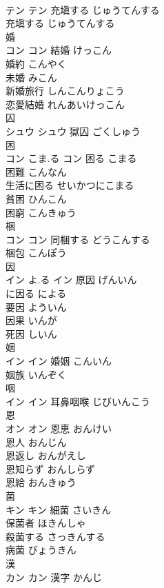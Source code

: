 \documentclass[8pt]{extreport}
\begin{document}
\begin{CJK}{UTF8}{min}
\\	テン		テン	充塡する	じゅうてんする	
\\	充塡する	じゅうてんする	
\\	婚	
\\	コン		コン	結婚	けっこん	
\\	婚約	こんやく	
\\	未婚	みこん	
\\	新婚旅行	しんこんりょこう	
\\	恋愛結婚	れんあいけっこん	
\\	囚	
\\	シュウ		シュウ													獄囚	ごくしゅう	
\\	困	
\\	コン	こま.る	コン	困る	こまる	
\\	困難	こんなん	
\\	生活に困る	せいかつにこまる	
\\	貧困	ひんこん	
\\	困窮	こんきゅう	
\\	梱	
\\	コン		コン	同梱する	どうこんする	
\\	梱包	こんぽう	
\\	因	
\\	イン	よ.る	イン	原因	げんいん	
\\	に因る	による	
\\	要因	よういん	
\\	因果	いんが	
\\	死因	しいん	
\\	姻	
\\	イン		イン	婚姻	こんいん	
\\	姻族	いんぞく	
\\	咽	
\\	イン		イン													耳鼻咽喉	じびいんこう	
\\	恩	
\\	オン		オン	恩恵	おんけい	
\\	恩人	おんじん	
\\	恩返し	おんがえし	
\\	恩知らず	おんしらず	
\\	恩給	おんきゅう	
\\	菌	
\\	キン		キン	細菌	さいきん	
\\	保菌者	ほきんしゃ	
\\	殺菌する	さっきんする	
\\	病菌	びょうきん	
\\	漢	
\\	カン		カン	漢字	かんじ	

\end{CJK}
\end{document}
